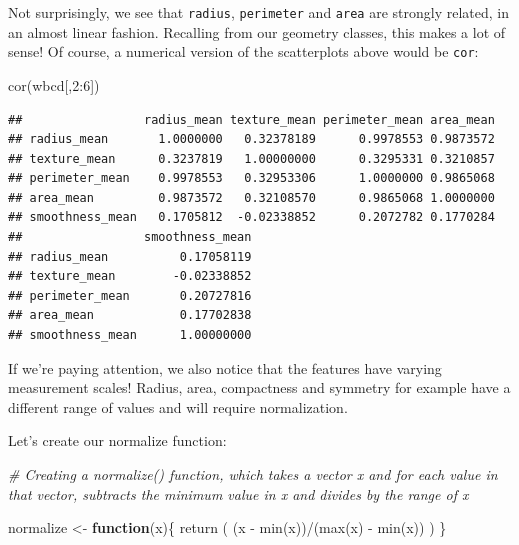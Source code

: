 \documentclass[
]{article}
\newenvironment{Shaded}{\begin{snugshade}}{\end{snugshade}}
\newcommand{\CommentTok}[1]{\textcolor[rgb]{0.56,0.35,0.01}{\textit{#1}}}
\newcommand{\ControlFlowTok}[1]{\textcolor[rgb]{0.13,0.29,0.53}{\textbf{#1}}}
\newcommand{\DecValTok}[1]{\textcolor[rgb]{0.00,0.00,0.81}{#1}}
\newcommand{\FunctionTok}[1]{\textcolor[rgb]{0.00,0.00,0.00}{#1}}
\newcommand{\NormalTok}[1]{#1}
\newcommand{\OtherTok}[1]{\textcolor[rgb]{0.56,0.35,0.01}{#1}}
\newcommand{\SpecialCharTok}[1]{\textcolor[rgb]{0.00,0.00,0.00}{#1}}
\begin{document}
Not surprisingly, we see that \texttt{radius}, \texttt{perimeter} and
\texttt{area} are strongly related, in an almost linear fashion.
Recalling from our geometry classes, this makes a lot of sense! Of
course, a numerical version of the scatterplots above would be
\texttt{cor}:

\begin{Shaded}
\begin{Highlighting}[]
\FunctionTok{cor}\NormalTok{(wbcd[,}\DecValTok{2}\SpecialCharTok{:}\DecValTok{6}\NormalTok{])}
\end{Highlighting}
\end{Shaded}

\begin{verbatim}
##                 radius_mean texture_mean perimeter_mean area_mean
## radius_mean       1.0000000   0.32378189      0.9978553 0.9873572
## texture_mean      0.3237819   1.00000000      0.3295331 0.3210857
## perimeter_mean    0.9978553   0.32953306      1.0000000 0.9865068
## area_mean         0.9873572   0.32108570      0.9865068 1.0000000
## smoothness_mean   0.1705812  -0.02338852      0.2072782 0.1770284
##                 smoothness_mean
## radius_mean          0.17058119
## texture_mean        -0.02338852
## perimeter_mean       0.20727816
## area_mean            0.17702838
## smoothness_mean      1.00000000
\end{verbatim}

If we're paying attention, we also notice that the features have varying
measurement scales! Radius, area, compactness and symmetry for example
have a different range of values and will require normalization.

Let's create our normalize function:

\begin{Shaded}
\begin{Highlighting}[]
\CommentTok{\# Creating a normalize() function, which takes a vector x and for each value in that vector, subtracts the minimum value in x and divides by the range of x}

\NormalTok{normalize }\OtherTok{\textless{}{-}} \ControlFlowTok{function}\NormalTok{(x)\{}
  \FunctionTok{return}\NormalTok{ ( }
\NormalTok{    (x }\SpecialCharTok{{-}} \FunctionTok{min}\NormalTok{(x))}\SpecialCharTok{/}\NormalTok{(}\FunctionTok{max}\NormalTok{(x) }\SpecialCharTok{{-}} \FunctionTok{min}\NormalTok{(x)) }
\NormalTok{  )}
\NormalTok{\}}
\end{Highlighting}
\end{Shaded}
\end{document}
